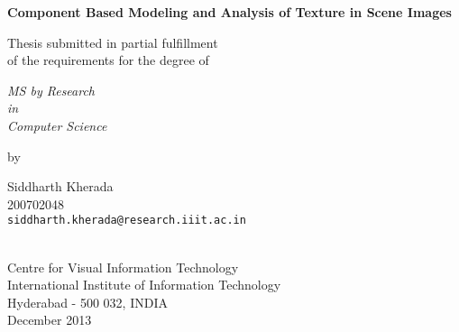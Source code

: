 \thispagestyle{empty}
\begin{center}
\vspace*{1.5cm}
{\Large \bf Component Based Modeling and Analysis of Texture in Scene Images}

\vspace*{3.75cm}
{\large Thesis submitted in partial fulfillment\\}
{\large  of the requirements for the degree of \\}

\vspace*{1cm}
{\it {\large MS by Research} \\
{\large in\\}
{\large Computer Science\\}}

\vspace*{1cm}
{\large by}

\vspace*{5mm}
{\large Siddharth Kherada\\}
{\large 200702048\\
{\small \tt siddharth.kherada@research.iiit.ac.in}}


\vspace*{4.0cm}
{\\}
{\large Centre for Visual Information Technology\\}
{\large International Institute of Information Technology\\}
{\large Hyderabad - 500 032, INDIA\\}
{\large December 2013\\}
\end{center}